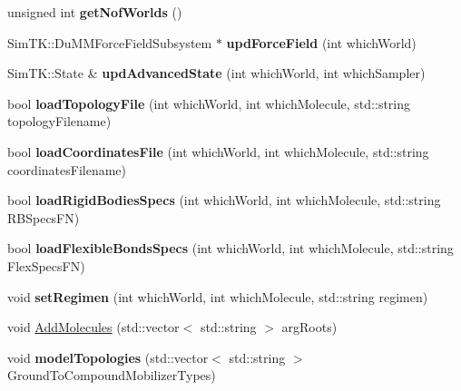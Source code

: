 \begin{DoxyCompactItemize}
\item 
unsigned int {\bfseries get\+Nof\+Worlds} ()\hypertarget{classContext_ac31e1ba0186a5b6a7d4ade15958cb2eb}{}\label{classContext_ac31e1ba0186a5b6a7d4ade15958cb2eb}

\item 
Sim\+T\+K\+::\+Du\+M\+M\+Force\+Field\+Subsystem $\ast$ {\bfseries upd\+Force\+Field} (int which\+World)\hypertarget{classContext_af1048e799296dee3b63b93ae79dbc4ff}{}\label{classContext_af1048e799296dee3b63b93ae79dbc4ff}

\item 
Sim\+T\+K\+::\+State \& {\bfseries upd\+Advanced\+State} (int which\+World, int which\+Sampler)\hypertarget{classContext_aba3acd8e9749a3b4d8ad5be5876acf08}{}\label{classContext_aba3acd8e9749a3b4d8ad5be5876acf08}

\item 
bool {\bfseries load\+Topology\+File} (int which\+World, int which\+Molecule, std\+::string topology\+Filename)\hypertarget{classContext_accc36f76330e7dcc5ecb29a91b5f51e3}{}\label{classContext_accc36f76330e7dcc5ecb29a91b5f51e3}

\item 
bool {\bfseries load\+Coordinates\+File} (int which\+World, int which\+Molecule, std\+::string coordinates\+Filename)\hypertarget{classContext_aef08b71378a98d420be726c420c15dcb}{}\label{classContext_aef08b71378a98d420be726c420c15dcb}

\item 
bool {\bfseries load\+Rigid\+Bodies\+Specs} (int which\+World, int which\+Molecule, std\+::string R\+B\+Specs\+FN)\hypertarget{classContext_aa0e54a21febcfd4614ac53a85a5af690}{}\label{classContext_aa0e54a21febcfd4614ac53a85a5af690}

\item 
bool {\bfseries load\+Flexible\+Bonds\+Specs} (int which\+World, int which\+Molecule, std\+::string Flex\+Specs\+FN)\hypertarget{classContext_a398bc5df5ca7229ad4351eb88d08c9db}{}\label{classContext_a398bc5df5ca7229ad4351eb88d08c9db}

\item 
void {\bfseries set\+Regimen} (int which\+World, int which\+Molecule, std\+::string regimen)\hypertarget{classContext_a3dd54f31104323e4d8df399da85e8ce1}{}\label{classContext_a3dd54f31104323e4d8df399da85e8ce1}

\item 
void \hyperlink{classContext_a35136bab91fe9f196a676a345b404339}{Add\+Molecules} (std\+::vector$<$ std\+::string $>$ arg\+Roots)
\item 
void {\bfseries model\+Topologies} (std\+::vector$<$ std\+::string $>$ Ground\+To\+Compound\+Mobilizer\+Types)\hypertarget{classContext_acf571a7ef2864aa092d411c0dfb8658a}{}\label{classContext_acf571a7ef2864aa092d411c0dfb8658a}


\end{DoxyCompactItemize}
